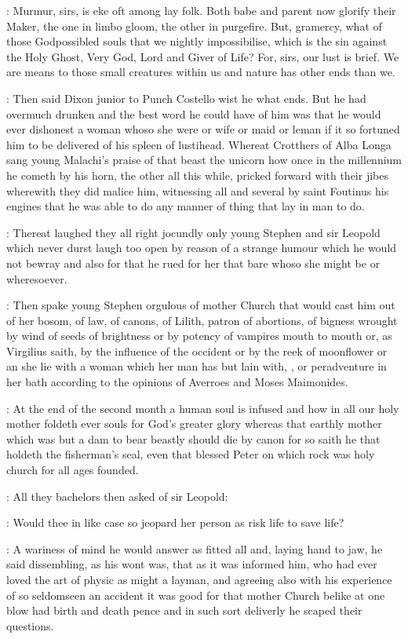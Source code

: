 \documentclass[12pt]{article}
\begin{document}
\SD: Murmur, sirs, is eke oft among lay folk. Both babe and parent now
glorify their Maker, the one in limbo gloom, the other in purgefire. But,
gramercy, what of those Godpossibled souls that we nightly impossibilise,
which is the sin against the Holy Ghost, Very God, Lord and Giver of Life?
For, sirs, our lust is brief. We are means to those small creatures within
us and nature has other ends than we.

: Then said Dixon junior to Punch Costello wist he what ends.
But he had overmuch drunken and the best word he could have of him was
that he would ever dishonest a woman whoso she were or wife or maid or
leman if it so fortuned him to be delivered of his spleen of lustihead.
Whereat Crotthers of Alba Longa sang young Malachi's praise of that beast
the unicorn how once in the millennium he cometh by his horn, the other
all this while, pricked forward with their jibes wherewith they did malice
him, witnessing all and several by saint Foutinus his engines that he was
able to do any manner of thing that lay in man to do.

: Thereat laughed they all right jocundly only young Stephen
and sir Leopold which never durst laugh too open by reason of a strange
humour which he would not bewray and also for that he rued for her that
bare whoso she might be or wheresoever.

: Then spake young Stephen orgulous of mother Church that would cast
him out of her bosom, of law, of canons, of Lilith, patron of abortions,
of bigness wrought by wind of seeds of brightness or by potency of
vampires mouth to mouth or, as Virgilius saith, by the influence of the
occident or by the reek of moonflower or an she lie with a woman which her
man has but lain with, , or peradventure in her bath
according to the opinions of Averroes and Moses Maimonides.

\SD: At the end of the second month a human soul is infused and how in all
our holy mother foldeth ever souls for God's greater glory whereas that
earthly mother which was but a dam to bear beastly should die by canon for
so saith he that holdeth the fisherman's seal, even that blessed Peter on
which rock was holy church for all ages founded.

: All they bachelors then asked of sir Leopold:

\All: Would thee in like case so jeopard her person as risk life to save
life?

: A wariness of mind he would answer as fitted all and, laying hand to
jaw, he said dissembling, as his wont was, that as it was informed him,
who had ever loved the art of physic as might a layman, and agreeing also
with his experience of so seldomseen an accident it was good for that
mother Church belike at one blow had birth and death pence and in such
sort deliverly he scaped their questions.
\end{document}
